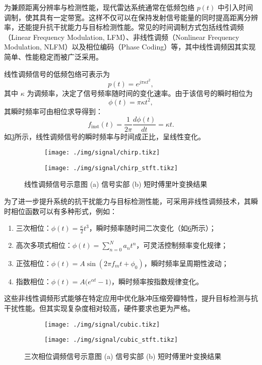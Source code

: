 为兼顾距离分辨率与检测性能，现代雷达系统通常在低频包络 $p(t)$ 中引入时间调制，使其具有一定带宽。这样不仅可以在保持发射信号能量的同时提高距离分辨率，还能提升抗干扰能力与目标检测性能。常见的时间调制方式包括线性调频（Linear Frequency Modulation, LFM）、非线性调频（Nonlinear Frequency Modulation, NLFM）以及相位编码（Phase Coding）等，其中线性调频因其实现简单、性能稳定而被广泛采用。

线性调频信号的低频包络可表示为
\[
    p(t) = e^{j \pi \kappa t^2},
\]
其中 $\kappa$ 为调频率，决定了信号频率随时间的变化速率。由于该信号的瞬时相位为
\[
    \phi(t) = \pi \kappa t^2,
\]
其瞬时频率可由相位求导得到：
\[
    f_{\text{inst}}(t) = \frac{1}{2\pi} \frac{d \phi(t)}{dt} = \kappa t.
\]
如\cref{fig_chirp}所示，线性调频信号的瞬时频率与时间成正比，呈线性变化。

\begin{figure}[htb!]
    \centering
    \begin{subfigure}{.45\textwidth}
        \centering
        \texttt{[image: ./img/signal/chirp.tikz]}
        \caption{}
        \label{fig_chirp_1}
    \end{subfigure}
    \begin{subfigure}{.45\textwidth}
        \centering
        \texttt{[image: ./img/signal/chirp\_stft.tikz]}
        \caption{}
        \label{fig_chirp_2}
    \end{subfigure}
    \caption{线性调频信号示意图 (a) 信号实部 (b) 短时傅里叶变换结果}
    \label{fig_chirp}
\end{figure}

为了进一步提升系统的抗干扰能力与目标检测性能，可采用非线性调频技术，其瞬时相位函数可以有多种形式，例如：
\begin{enumerate}
    \item 三次相位：$\phi(t) = \frac{\kappa}{2} t^3$，瞬时频率随时间二次变化（如\cref{fig_cubic}所示）；
    \item 高次多项式相位：$\phi(t) = \sum_{n=0}^{N} a_n t^n$，可灵活控制频率变化规律；
    \item 正弦相位：$\phi(t) = A \sin(2 \pi f_m t + \phi_0)$，瞬时频率呈周期性波动；
    \item 指数相位：$\phi(t) = A \big(e^{\alpha t} - 1\big)$，瞬时频率按指数规律变化。
\end{enumerate}
这些非线性调频形式能够在特定应用中优化脉冲压缩旁瓣特性，提升目标检测与抗干扰性能。但其实现复杂度相对较高，硬件要求也更为严格。

\begin{figure}[htb!]
    \centering
    \begin{subfigure}{.45\textwidth}
        \centering
        \texttt{[image: ./img/signal/cubic.tikz]}
        \caption{}
        \label{fig_cubic_1}
    \end{subfigure}
    \begin{subfigure}{.45\textwidth}
        \centering
        \texttt{[image: ./img/signal/cubic\_stft.tikz]}
        \caption{}
        \label{fig_cubic_2}
    \end{subfigure}
    \caption{三次相位调频信号示意图 (a) 信号实部 (b) 短时傅里叶变换结果}
    \label{fig_cubic}
\end{figure}


